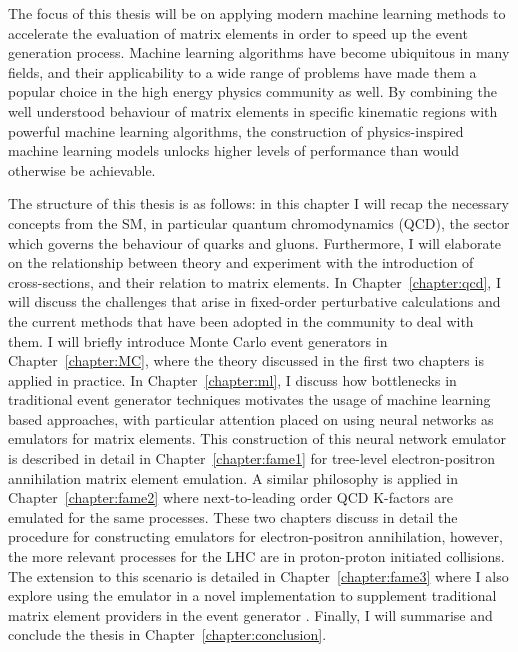 \documentclass[main.tex]{subfiles}
\begin{document}
The focus of this thesis will be on applying modern
machine learning methods to accelerate the evaluation
of matrix elements in order to speed up the event
generation process. Machine learning algorithms
have become ubiquitous in many fields, and their applicability
to a wide range of problems have made them a popular choice
in the high energy physics community as well. By combining the
well understood behaviour of matrix elements in specific
kinematic regions with powerful machine learning
algorithms, the construction of physics-inspired machine
learning models unlocks higher levels of performance
than would otherwise be achievable.

The structure of this thesis is as follows: in this chapter
I will recap the necessary concepts from the SM,
in particular quantum chromodynamics (QCD), the sector
which governs the behaviour of quarks and gluons. Furthermore,
I will elaborate on the relationship between theory and experiment
with the introduction of cross-sections, and their relation
to matrix elements.
In Chapter~\ref{chapter:qcd}, I will discuss the challenges that arise
in fixed-order perturbative calculations and the current methods
that have been adopted in the community to deal with them.
I will briefly introduce Monte Carlo event generators in
Chapter~\ref{chapter:MC}, where the theory discussed in the first
two chapters is applied in practice. In Chapter~\ref{chapter:ml},
I discuss how bottlenecks in traditional event generator techniques
motivates the usage of machine learning based approaches, with
particular attention placed on using neural networks as emulators
for matrix elements.
This construction of this neural network emulator is
described in detail in Chapter~\ref{chapter:fame1} for tree-level
electron-positron annihilation matrix element emulation.
A similar philosophy is applied in Chapter~\ref{chapter:fame2}
where next-to-leading order QCD K-factors are emulated for
the same processes.
These two chapters discuss in detail the procedure for
constructing emulators for electron-positron annihilation,
however, the more relevant processes for the LHC are in
proton-proton initiated collisions. The extension
to this scenario is detailed in Chapter~\ref{chapter:fame3}
where I also explore using the
emulator in a novel implementation to supplement traditional
matrix element providers in the event generator {\Sherpa}.
Finally, I will summarise and conclude the thesis in
Chapter~\ref{chapter:conclusion}.
\end{document}
